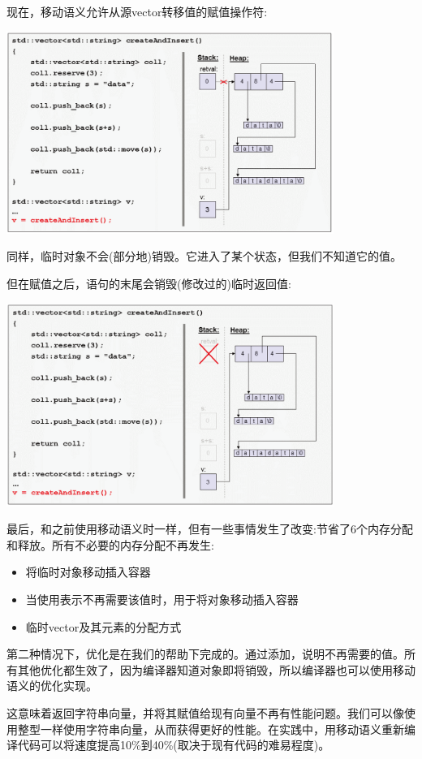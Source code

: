 \begin{itemize}
	现在，移动语义允许从源vector转移值的赋值操作符:
\begin{center}
		\includegraphics[width=0.8\textwidth]{part1/ch1/images/16}
	\end{center}
	同样，临时对象不会(部分地)销毁。它进入了某个状态，但我们不知道它的值。

	但在赋值之后，语句的末尾会销毁(修改过的)临时返回值:
\begin{center}
		\includegraphics[width=0.8\textwidth]{part1/ch1/images/17}
	\end{center}
\end{itemize}

最后，和之前使用移动语义时一样，但有一些事情发生了改变:节省了6个内存分配和释放。所有不必要的内存分配不再发生:

\begin{itemize}
	\item 将临时对象移动插入容器
	\item 当使用表示不再需要该值时，用于将对象移动插入容器
	\item 临时vector及其元素的分配方式
\end{itemize}

第二种情况下，优化是在我们的帮助下完成的。通过添加，说明不再需要的值。所有其他优化都生效了，因为编译器知道对象即将销毁，所以编译器也可以使用移动语义的优化实现。

这意味着返回字符串向量，并将其赋值给现有向量不再有性能问题。我们可以像使用整型一样使用字符串向量，从而获得更好的性能。在实践中，用移动语义重新编译代码可以将速度提高10\%到40\%(取决于现有代码的难易程度)。


























